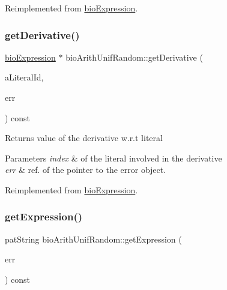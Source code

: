 Reimplemented from \hyperlink{classbio_expression_a4ee1b8add634078a02eaae26cd40dcc8}{bio\+Expression}.

\mbox{\label{classbio_arith_unif_random_ab235d1b207d96e122b5b595ddeb70a68}} 
\subsubsection{\texorpdfstring{get\+Derivative()}{getDerivative()}}
{\footnotesize\ttfamily \hyperlink{classbio_expression}{bio\+Expression} $\ast$ bio\+Arith\+Unif\+Random\+::get\+Derivative (\begin{DoxyParamCaption}\item[{pat\+U\+Long}]{a\+Literal\+Id,  }\item[{pat\+Error $\ast$\&}]{err }\end{DoxyParamCaption}) const\hspace{0.3cm}{\ttfamily [virtual]}}

\begin{DoxyReturn}{Returns}
value of the derivative w.\+r.\+t literal 
\end{DoxyReturn}

\begin{DoxyParams}{Parameters}
{\em index} & of the literal involved in the derivative \\
\hline
{\em err} & ref. of the pointer to the error object. \\
\hline
\end{DoxyParams}


Reimplemented from \hyperlink{classbio_expression_a5915579d1193f25f216c1e273c97f2ce}{bio\+Expression}.

\mbox{\label{classbio_arith_unif_random_a4c81af6983404929d1e06367f69a2256}} 
\subsubsection{\texorpdfstring{get\+Expression()}{getExpression()}}
{\footnotesize\ttfamily pat\+String bio\+Arith\+Unif\+Random\+::get\+Expression (\begin{DoxyParamCaption}\item[{pat\+Error $\ast$\&}]{err }\end{DoxyParamCaption}) const\hspace{0.3cm}{\ttfamily [virtual]}}

